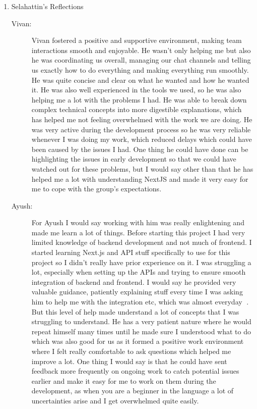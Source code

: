 \documentclass[a4paper, 12pt]{article}
\begin{document}
\begin{enumerate}
    \item Selahattin's Reflections
        \begin{description}
            \item[Vivan: ] Vivan fostered a positive and supportive environment, making team interactions smooth and enjoyable. He wasn’t only helping me but also he was coordinating us overall, managing our chat channels and telling us exactly how to do everything and making everything run smoothly. He was quite concise and clear on what he wanted and how he wanted it. He was also well experienced in the tools we used, so he was also helping me a lot with the problems I had. He was able to break down complex technical concepts into more digestible explanations, which has helped me not feeling overwhelmed with the work we are doing. He was very active during the development process so he was very reliable whenever I was doing my work, which reduced delays which could have been caused by the issues I had. One thing he could have done can be highlighting the issues in early development so that we could have watched out for these problems, but I would say other than that he has helped me a lot with understanding NextJS and made it very easy for me to cope with the group’s expectations.
            \item[Ayush: ] For Ayush I would say working with him was really enlightening and made me learn a lot of things. Before starting this project I had very limited knowledge of backend development and not much of frontend. I started learning Next.js and API stuff specifically to use for this project so I didn’t really have prior experience on it. I was struggling a lot, especially when setting up the APIs and trying to ensure smooth integration of backend and frontend. I would say he provided very valuable guidance, patiently explaining stuff every time I was asking him to help me with the integration etc, which was almost everyday . But this level of help made understand a lot of concepts that I was struggling to understand. He has a very patient nature where he would repeat himself many times until he made sure I understood what to do which was also good for us as it formed a positive work environment where I felt really comfortable to ask questions which helped me improve a lot. One thing I would say is that he could have sent feedback more frequently on ongoing work to catch potential issues earlier and make it easy for me to work on them during the development, as when you are a beginner in the language a lot of uncertainties arise and I get overwhelmed quite easily.

\end{description}
\end{enumerate}
\end{document}

